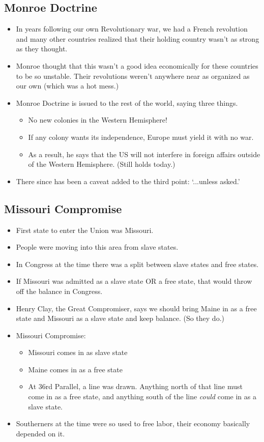 \documentclass{article}
\begin{document}
    \subsection{Monroe Doctrine}
      \begin{itemize}
        \item In years following our own Revolutionary war, we had a French revolution and many other countries realized that their holding country wasn't as strong as they thought.
        \item Monroe thought that this wasn't a good idea economically for these countries to be so unstable. Their revolutions weren't anywhere near as organized as our own (which was a hot mess.)
        \item Monroe Doctrine is issued to the rest of the world, saying three things.
        \begin{itemize}
          \item No new colonies in the Western Hemisphere!
          \item If any colony wants its independence, Europe must yield it with no war.
          \item As a result, he says that the US will not interfere in foreign affairs outside of the Western Hemisphere. (Still holds today.)
        \end{itemize}
        \item There since has been a caveat added to the third point: `...unless asked.'
      \end{itemize}

    \subsection{Missouri Compromise}
    \begin{itemize}
      \item First state to enter the Union was Missouri.
      \item People were moving into this area from slave states.
      \item In Congress at the time there was a split between slave states and free states.
      \item If Missouri was admitted as a slave state OR a free state, that would throw off the balance in Congress.
      \item Henry Clay, the Great Compromiser, says we should bring Maine in as a free state and Missouri as a slave state and keep balance. (So they do.)
      \item Missouri Compromise:
      \begin{itemize}
        \item Missouri comes in as slave state
        \item Maine comes in as a free state
        \item At 36rd Parallel, a line was drawn. Anything north of that line must come in as a free state, and anything south of the line \emph{could} come in as a slave state. 
      \end{itemize}
      \item Southerners at the time were so used to free labor, their economy basically depended on it.
    \end{itemize}
\end{document}
